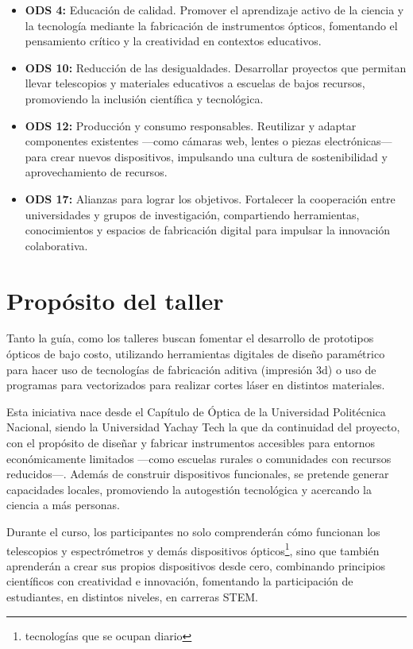 \documentclass[12pt, twoside]{book}
\begin{document}
	\begin{itemize}
		\item \textbf{ODS 4:} Educación de calidad. Promover el aprendizaje activo de la ciencia y la tecnología mediante la fabricación de instrumentos ópticos, fomentando el pensamiento crítico y la creatividad en contextos educativos.
		\item \textbf{ODS 10:} Reducción de las desigualdades. Desarrollar proyectos que permitan llevar telescopios y materiales educativos a escuelas de bajos recursos, promoviendo la inclusión científica y tecnológica.
		\item \textbf{ODS 12:} Producción y consumo responsables. Reutilizar y adaptar componentes existentes —como cámaras web, lentes o piezas electrónicas— para crear nuevos dispositivos, impulsando una cultura de sostenibilidad y aprovechamiento de recursos.
		\item \textbf{ODS 17:} Alianzas para lograr los objetivos. Fortalecer la cooperación entre universidades y grupos de investigación, compartiendo herramientas, conocimientos y espacios de fabricación digital para impulsar la innovación colaborativa.
	\end{itemize}
	
	\section*{Propósito del taller}
	
	Tanto la guía, como los talleres buscan fomentar el desarrollo de prototipos ópticos de bajo costo, utilizando herramientas digitales de diseño paramétrico para hacer uso de tecnologías de fabricación aditiva (impresión 3d) o uso de programas para vectorizados para realizar cortes láser en distintos materiales.
	
	Esta iniciativa nace desde el Capítulo de Óptica de la Universidad Politécnica Nacional, siendo la Universidad Yachay Tech la que da continuidad del proyecto, con el propósito de diseñar y fabricar instrumentos accesibles para entornos económicamente limitados —como escuelas rurales o comunidades con recursos reducidos—.
	Además de construir dispositivos funcionales, se pretende generar capacidades locales, promoviendo la autogestión tecnológica y acercando la ciencia a más personas. 
	
	Durante el curso, los participantes no solo comprenderán cómo funcionan los telescopios y espectrómetros y demás dispositivos ópticos\footnote{tecnologías que se ocupan diario}, sino que también aprenderán a crear sus propios dispositivos desde cero, combinando principios científicos con creatividad e innovación, fomentando la participación de estudiantes, en distintos niveles, en carreras STEM.
	
\end{document}
